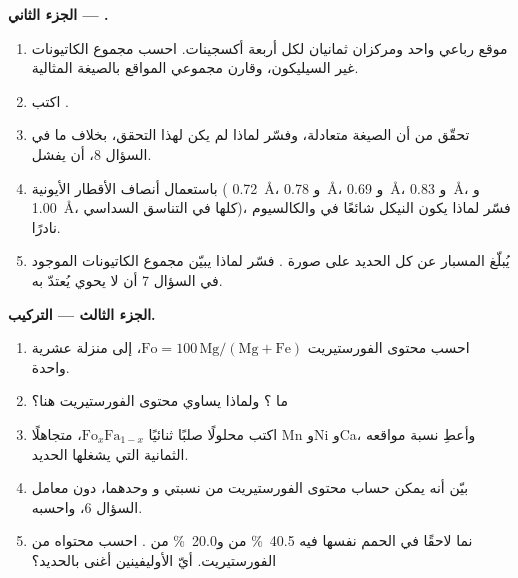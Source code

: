\begin{problem}
\medskip
\noindent\textbf{الجزء الثاني --- .}
\begin{enumerate}[resume]
  \item {} موقع رباعي واحد ومركزان ثمانيان لكل أربعة أكسجينات. احسب مجموع الكاتيونات غير السيليكون، وقارن مجموعي المواقع بالصيغة المثالية.
  \item اكتب  .
  \item تحقّق من أن الصيغة متعادلة، وفسّر لماذا لم يكن لهذا التحقق، بخلاف ما في السؤال 8، أن يفشل.
  \item باستعمال أنصاف الأقطار الأيونية ( \qty{0.72}{\angstrom}، و \qty{0.78}{\angstrom}، و \qty{0.69}{\angstrom}، و \qty{0.83}{\angstrom}، و \qty{1.00}{\angstrom}، كلها في التناسق السداسي)، فسّر لماذا يكون النيكل شائعًا في  والكالسيوم نادرًا.
  \item يُبلّغ المسبار عن كل الحديد على صورة . فسّر لماذا يبيّن مجموع الكاتيونات الموجود في السؤال 7 أن  لا يحوي  يُعتدّ به.
\end{enumerate}

\medskip
\noindent\textbf{الجزء الثالث --- التركيب.}
\begin{enumerate}[resume]
  \item احسب محتوى الفورستيريت $\mathrm{Fo} = 100\,\mathrm{Mg}/(\mathrm{Mg} +
        \mathrm{Fe})$، إلى منزلة عشرية واحدة.
  \item ما  ؟ ولماذا يساوي محتوى الفورستيريت هنا؟
  \item اكتب  محلولًا صلبًا ثنائيًا $\mathrm{Fo}_x\mathrm{Fa}_{1-x}$، متجاهلًا Mn وNi وCa، وأعطِ نسبة مواقعه الثمانية التي يشغلها الحديد.
  \item بيّن أنه يمكن حساب محتوى الفورستيريت من نسبتي  و وحدهما، دون معامل السؤال 6، واحسبه.
  \item {} نما لاحقًا في الحمم نفسها فيه \qty{40.5}{\percent} من  و\qty{20.0}{\percent} من . احسب محتواه من الفورستيريت. أيّ الأوليفينين أغنى بالحديد؟
\end{enumerate}


\end{problem}
